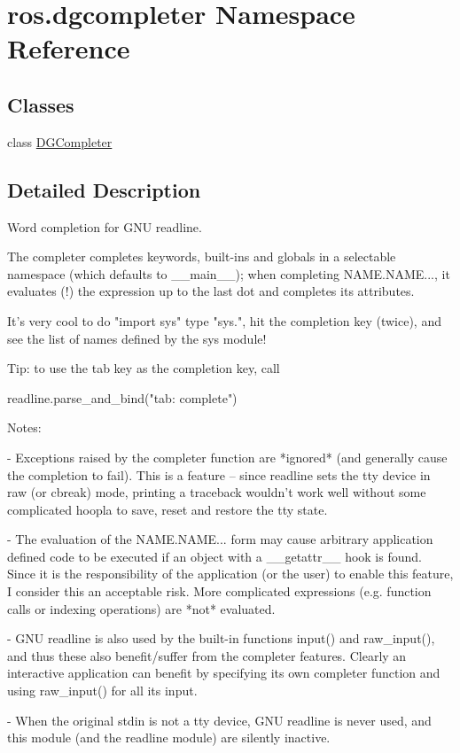 \hypertarget{namespaceros_1_1dgcompleter}{}\section{ros.\+dgcompleter Namespace Reference}
\label{namespaceros_1_1dgcompleter}
\subsection*{Classes}
\begin{DoxyCompactItemize}
\item 
class \hyperlink{classros_1_1dgcompleter_1_1DGCompleter}{D\+G\+Completer}
\end{DoxyCompactItemize}


\subsection{Detailed Description}
\begin{DoxyVerb}Word completion for GNU readline.

The completer completes keywords, built-ins and globals in a selectable
namespace (which defaults to __main__); when completing NAME.NAME..., it
evaluates (!) the expression up to the last dot and completes its attributes.

It's very cool to do "import sys" type "sys.", hit the completion key (twice),
and see the list of names defined by the sys module!

Tip: to use the tab key as the completion key, call

    readline.parse_and_bind("tab: complete")

Notes:

- Exceptions raised by the completer function are *ignored* (and generally cause
  the completion to fail).  This is a feature -- since readline sets the tty
  device in raw (or cbreak) mode, printing a traceback wouldn't work well
  without some complicated hoopla to save, reset and restore the tty state.

- The evaluation of the NAME.NAME... form may cause arbitrary application
  defined code to be executed if an object with a __getattr__ hook is found.
  Since it is the responsibility of the application (or the user) to enable this
  feature, I consider this an acceptable risk.  More complicated expressions
  (e.g. function calls or indexing operations) are *not* evaluated.

- GNU readline is also used by the built-in functions input() and
raw_input(), and thus these also benefit/suffer from the completer
features.  Clearly an interactive application can benefit by
specifying its own completer function and using raw_input() for all
its input.

- When the original stdin is not a tty device, GNU readline is never
  used, and this module (and the readline module) are silently inactive.\end{DoxyVerb}
 